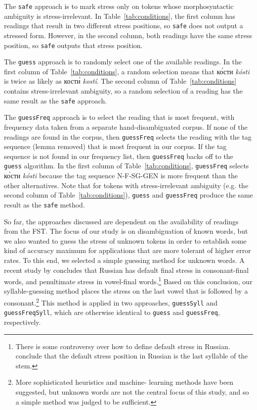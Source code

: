 \documentclass[11pt]{article}
\newcommand{\rus}[1]{\foreignlanguage{russian}{#1}}
\begin{document}
The {\small {\tt safe}} approach is to mark stress only on
tokens whose morphosyntactic ambiguity is stress-irrelevant. In 
Table~\ref{tab:conditions}, the first column has readings that result in two
different stress positions, so {\small {\tt safe}} does not output a stressed
form. However, in the second column, both readings have the same stress position, 
so {\small {\tt safe}} outputs that stress position.

The {\small {\tt guess}} approach is to randomly select one of the available 
readings. In the first column of
Table~\ref{tab:conditions}, a random selection means that \rus{к\'{о}сти} 
\emph{k\'{o}sti} is twice as likely as \rus{кост\'{и}} \emph{kost\'{i}}. The
second column of Table~\ref{tab:conditions} contains stress-irrelevant
ambiguity, so a random selection of a reading has the same result as the
{\small {\tt safe}} approach.
 
The {\small {\tt guessFreq}} 
approach is to select the reading that is most frequent, with frequency data
taken from a separate hand-disambiguated corpus. If none of the readings are 
found in the corpus, then {\small {\tt guessFreq}} selects the reading
with the tag sequence (lemma removed) that is most frequent in our corpus. If the 
tag sequence is not found
in our frequency list, then {\small {\tt guessFreq}} backs off to the 
{\small {\tt guess}} algorithm. In the first column of
Table~\ref{tab:conditions}, {\small {\tt guessFreq}} selects \rus{к\'{о}сти} 
\emph{k\'{o}sti} because the tag sequence N-F-SG-GEN is more frequent than the
other alternatives. Note 
that for tokens with stress-irrelevant ambiguity (e.g. the second column of
Table~\ref{tab:conditions}), {\small {\tt guess}} and 
{\small {\tt guessFreq}} produce the same result as the {\small {\tt safe}} 
method.

So far, the approaches discussed are dependent on the availability of readings 
from the FST. The focus of our study is on disambiguation of known 
words, but we also wanted to guess the stress of unknown tokens in order to 
establish some kind of accuracy maximum for applications that are more tolerant 
of higher error rates. To this end, we selected a simple guessing method for 
unknown words. A recent study by  concludes that 
Russian has default final stress in consonant-final words, and penultimate stress 
in vowel-final words.\footnote{There is some controversy over how to define 
default stress in Russian.  conclude that the default 
stress position in Russian is the last syllable of the stem.} Based on this 
conclusion, our syllable-guessing method places the stress on the last vowel that 
is followed by a consonant.\footnote{More sophisticated heuristics and machine-
learning methods have been suggested, but unknown words are not the central focus 
of this study, and so a simple method was judged to be sufficient.} This method 
is applied in two approaches, {\small {\tt guessSyll}} 
and {\small {\tt guessFreqSyll}}, which are otherwise identical to 
{\small {\tt guess}} and {\small {\tt guessFreq}}, respectively.
\end{document}
